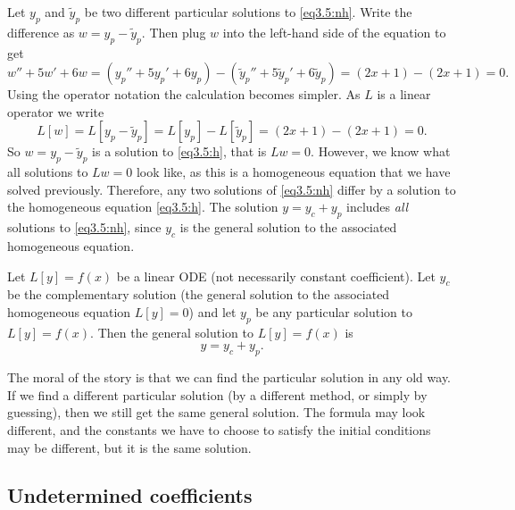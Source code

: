 Let $y_p$ and $\tilde{y}_p$ be two different
particular solutions 
to \eqref{eq3.5:nh}.
Write the difference as
$w = y_p - \tilde{y}_p$.  Then plug $w$
into the left-hand side of the equation to get
\begin{equation*}
w'' + 5w'+ 6w =
(y_p'' + 5y_p'+ 6y_p) -
(\tilde{y}_p'' + 5\tilde{y}_p'+ 6\tilde{y}_p) =
(2x+1) - (2x+1) = 0 .
\end{equation*}
Using the operator notation the calculation becomes simpler.
As $L$ is a linear operator we write
\begin{equation*}
L[w] = L[y_p - \tilde{y}_p] =
L[y_p] - L[\tilde{y}_p] =
(2x+1)-(2x+1) = 0 .
\end{equation*}
So $w = y_p - \tilde{y}_p$ is a solution to \eqref{eq3.5:h}, that is
$Lw = 0$. However, we know what all solutions to $Lw = 0$ look like, as this is a homogeneous equation that we have solved previously. Therefore, any two
solutions of \eqref{eq3.5:nh} differ by a solution to the homogeneous
equation \eqref{eq3.5:h}.  The solution $y = y_c + y_p$ includes \emph{all}
solutions to \eqref{eq3.5:nh},
since $y_c$ is the general solution to the associated homogeneous equation.

\begin{theorem1}{}
Let $L[y]=f(x)$ be a linear ODE (not necessarily constant
coefficient).  Let $y_c$ be the complementary solution
(the general
solution to the associated homogeneous equation $L[y] = 0$) and let $y_p$
be any particular solution to $L[y]=f(x)$.  Then the general
solution to $L[y]=f(x)$ is
\begin{equation*}
y = y_c + y_p.
\end{equation*}
\end{theorem1}

The moral of the story is that we can find the particular solution in any old
way.  If we find a different particular solution (by a different method,
or simply by guessing),
then we still get the same general solution.
The formula may 
look different, and the constants we have to choose to
satisfy
the initial conditions may be different, but it is the same solution.

\subsection{Undetermined coefficients}

